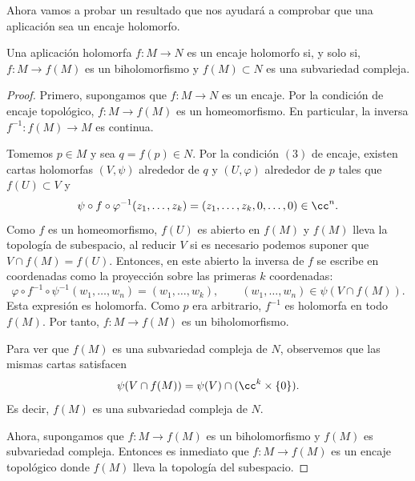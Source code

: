     Ahora vamos a probar un resultado que nos ayudará a comprobar que una aplicación sea un encaje holomorfo. 
    
    \begin{propo}\label{encajesubvariedades}
    	Una aplicación holomorfa $f:M\to N$ es un encaje holomorfo si, y solo si, $f:M\to f(M)$ es un biholomorfismo y $f(M)\subset N$ es una subvariedad compleja.
    \end{propo}
    \begin{proof}
    		Primero, supongamos que $f:M\to N$ es un encaje. Por la condición de encaje topológico, $f:M\to f(M)$ es un homeomorfismo. En particular, la inversa $f^{-1}:f(M)\to M$ es continua.
    		
    		Tomemos $p\in M$ y sea $q=f(p)\in N$. Por la condición $(3)$ de encaje, existen cartas holomorfas $(V,\psi)$ alrededor de $q$ y $(U,\varphi)$ alrededor de $p$ tales que $f(U)\subset V$ y
    		\begin{equation*}
    			\psi\circ f\circ \varphi^{-1}(z_1,\dots,z_k)=(z_1,\dots,z_k,0,\dots,0)\in \cc^n.
    		\end{equation*}
    		Como $f$ es un homeomorfismo, $f(U)$ es abierto en $f(M)$ y $f(M)$ lleva la topología de subespacio, al reducir $V$ si es necesario podemos suponer que $V\cap f(M)=f(U)$. Entonces, en este abierto la inversa de $f$ se escribe en coordenadas como la proyección sobre las primeras $k$ coordenadas:
    		\begin{equation*}
    			\varphi\circ f^{-1}\circ \psi^{-1}(w_1,\dots,w_n)=(w_1,\dots,w_k),
    			\qquad (w_1,\dots,w_n)\in \psi(V\cap f(M)).
    		\end{equation*}
    		Esta expresión es holomorfa. Como $p$ era arbitrario, $f^{-1}$ es holomorfa en todo $f(M)$. Por tanto, $f:M\to f(M)$ es un biholomorfismo.
    		
    		Para ver que $f(M)$ es una subvariedad compleja de $N$, observemos que las mismas cartas satisfacen
    		\begin{equation*}
    			\psi(V\cap f(M))=\psi(V)\cap (\cc^k\times \{0\}).
    		\end{equation*}
  			Es decir, $f(M)$ es una subvariedad compleja de $N$.
  			
  			Ahora, supongamos que $f:M\to f(M)$ es un biholomorfismo y $f(M)$ es subvariedad compleja. Entonces es inmediato que $f:M\to f(M)$ es un encaje topológico donde $f(M)$ lleva la topología del subespacio. 
  			

\end{proof}
